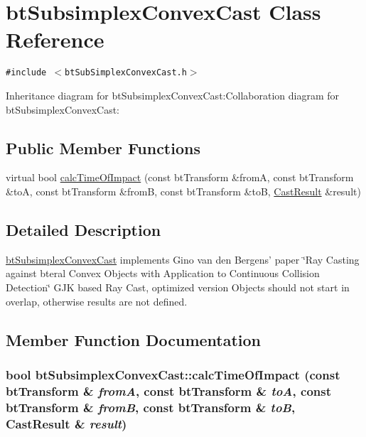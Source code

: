 \hypertarget{classbt_subsimplex_convex_cast}{
\section{btSubsimplexConvexCast Class Reference}
\label{classbt_subsimplex_convex_cast}
}
{\tt \#include $<$btSubSimplexConvexCast.h$>$}

Inheritance diagram for btSubsimplexConvexCast:Collaboration diagram for btSubsimplexConvexCast:\subsection*{Public Member Functions}
\begin{CompactItemize}
\item 
virtual bool \hyperlink{classbt_subsimplex_convex_cast_93202199b82c9d2f3074617f8db72e17}{calcTimeOfImpact} (const btTransform \&fromA, const btTransform \&toA, const btTransform \&fromB, const btTransform \&toB, \hyperlink{structbt_convex_cast_1_1_cast_result}{CastResult} \&result)
\end{CompactItemize}


\subsection{Detailed Description}
\hyperlink{classbt_subsimplex_convex_cast}{btSubsimplexConvexCast} implements Gino van den Bergens' paper \char`\"{}Ray Casting against bteral Convex Objects with Application to Continuous Collision Detection\char`\"{} GJK based Ray Cast, optimized version Objects should not start in overlap, otherwise results are not defined. 

\subsection{Member Function Documentation}
\hypertarget{classbt_subsimplex_convex_cast_93202199b82c9d2f3074617f8db72e17}{
\subsubsection[calcTimeOfImpact]{\setlength{\rightskip}{0pt plus 5cm}bool btSubsimplexConvexCast::calcTimeOfImpact (const btTransform \& {\em fromA}, \/  const btTransform \& {\em toA}, \/  const btTransform \& {\em fromB}, \/  const btTransform \& {\em toB}, \/  {\bf CastResult} \& {\em result})}}
\label{classbt_subsimplex_convex_cast_93202199b82c9d2f3074617f8db72e17}


